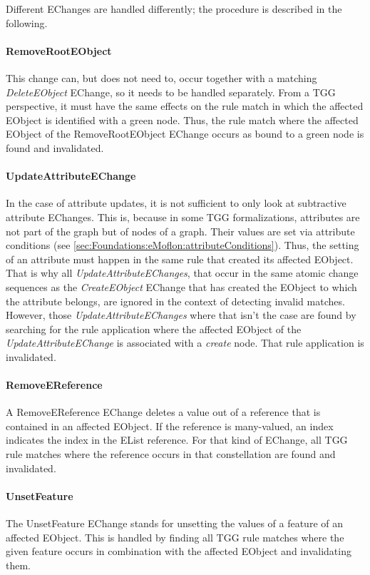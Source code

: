Different EChanges are handled differently; the procedure is described in the following.

\paragraph{RemoveRootEObject} This change can, but does not need to, occur together with a matching \emph{DeleteEObject} EChange, so it needs to be handled separately.
From a TGG perspective, it must have the same effects on the rule match in which the affected EObject is identified with a green node.
Thus, the rule match where the affected EObject of the RemoveRootEObject EChange occurs as bound to a green node is found and invalidated.

\paragraph{UpdateAttributeEChange}
In the case of attribute updates, it is not sufficient to only look at subtractive attribute EChanges. This is, because in some TGG formalizations, attributes are not part of the graph but of nodes of a graph. Their values are set via attribute conditions (see \autoref{sec:Foundations:eMoflon:attributeConditions}). Thus, the setting of an attribute must happen in the same rule that created its affected EObject.
That is why all \emph{UpdateAttributeEChanges}, that occur in the same atomic change sequences as the \emph{CreateEObject} EChange that has created the EObject to which the attribute belongs, are ignored in the context of detecting invalid matches.
However, those \emph{UpdateAttributeEChanges} where that isn't the case are found by searching for the rule application where the affected EObject of the \emph{UpdateAttributeEChange} is associated with a \emph{create} node. That rule application is invalidated.

\paragraph{RemoveEReference} 
A RemoveEReference EChange deletes a value out of a reference that is contained in an affected EObject. If the reference is many-valued, an index indicates the index in the EList reference.
For that kind of EChange, all TGG rule matches where the reference occurs in that constellation are found and invalidated.

\paragraph{UnsetFeature} The UnsetFeature EChange stands for unsetting the values of a feature of an affected EObject. This is handled by finding all TGG rule matches where the given feature occurs in combination with the affected EObject and invalidating them.

